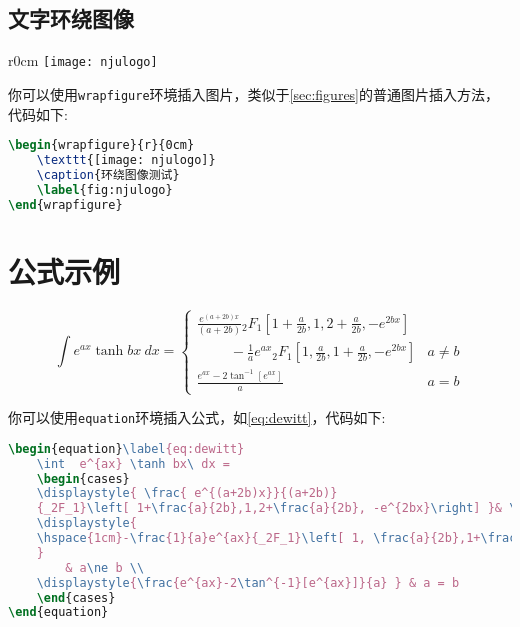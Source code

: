\documentclass[
    TitleLength=1,%
    Degree=UG,%
    Type=thesis%
]{njuthesis}
\begin{document}
\subsection{文字环绕图像}
\begin{wrapfigure}{r}{0cm}
    \texttt{[image: njulogo]}
    \caption{环绕图像测试}
    \label{fig:njulogo}
\end{wrapfigure}
\zhlipsum[4][name=xiangyu]

你可以使用\lstinline|wrapfigure|环境插入图片，类似于\cref{sec:figures}的普通图片插入方法，代码如下:
\begin{lstlisting}[language=TeX]
\begin{wrapfigure}{r}{0cm}
    \texttt{[image: njulogo]}
    \caption{环绕图像测试}
    \label{fig:njulogo}
\end{wrapfigure}
\end{lstlisting}

\section{公式示例}
\begin{equation}\label{eq:dewitt}
    \int  e^{ax} \tanh bx\ dx = 
    \begin{cases}
    \displaystyle{ \frac{ e^{(a+2b)x}}{(a+2b)} 
    {_2F_1}\left[ 1+\frac{a}{2b},1,2+\frac{a}{2b}, -e^{2bx}\right] }& \\
    \displaystyle{
    \hspace{1cm}-\frac{1}{a}e^{ax}{_2F_1}\left[ 1, \frac{a}{2b},1+\frac{a}{2b}, -e^{2bx}\right]
    }
     & a\ne b \\
    \displaystyle{\frac{e^{ax}-2\tan^{-1}[e^{ax}]}{a} } & a = b
    \end{cases}
\end{equation}
    
你可以使用\lstinline|equation|环境插入公式，如\cref{eq:dewitt}，代码如下:
\begin{lstlisting}[language=TeX]
\begin{equation}\label{eq:dewitt}
    \int  e^{ax} \tanh bx\ dx = 
    \begin{cases}
    \displaystyle{ \frac{ e^{(a+2b)x}}{(a+2b)} 
    {_2F_1}\left[ 1+\frac{a}{2b},1,2+\frac{a}{2b}, -e^{2bx}\right] }& \\
    \displaystyle{
    \hspace{1cm}-\frac{1}{a}e^{ax}{_2F_1}\left[ 1, \frac{a}{2b},1+\frac{a}{2b}, -e^{2bx}\right]
    }
        & a\ne b \\
    \displaystyle{\frac{e^{ax}-2\tan^{-1}[e^{ax}]}{a} } & a = b
    \end{cases}
\end{equation}
\end{lstlisting}
\end{document}
